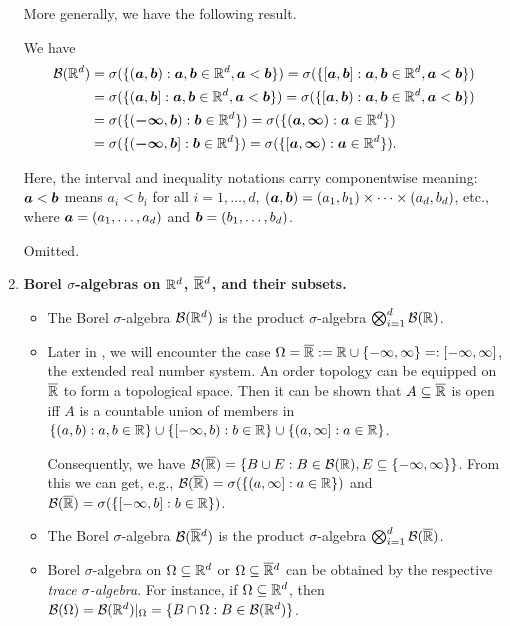 \begin{enumerate}
More generally, we have the following result.
\begin{proposition}
\label{prp:borel-rd-generators}
We have
\begin{align*}
\mathcal{B}(\mathbb{R}^d)
&=\sigma(\{(\bm{a},\bm{b}):\bm{a},\bm{b}\in\mathbb{R}^d, \bm{a}<\bm{b}\})
=\sigma(\{[\bm{a},\bm{b}]:\bm{a},\bm{b}\in\mathbb{R}^d, \bm{a}<\bm{b}\}) \\
&=\sigma(\{(\bm{a},\bm{b}]:\bm{a},\bm{b}\in\mathbb{R}^d, \bm{a}<\bm{b}\})
=\sigma(\{[\bm{a},\bm{b}):\bm{a},\bm{b}\in\mathbb{R}^d, \bm{a}<\bm{b}\}) \\
&=\sigma(\{(\bm{-\infty},\bm{b}):\bm{b}\in\mathbb{R}^d\})
=\sigma(\{(\bm{a},\bm{\infty}):\bm{a}\in\mathbb{R}^d\}) \\
&=\sigma(\{(\bm{-\infty},\bm{b}]:\bm{b}\in\mathbb{R}^d\})
=\sigma(\{[\bm{a},\bm{\infty}):\bm{a}\in\mathbb{R}^d\}).
\end{align*}
\end{proposition}
\begin{note}
Here, the interval and inequality notations carry componentwise meaning:
\(\bm{a}<\bm{b}\) means \(a_i<b_i\) for all \(i=1,\dotsc,d\),
\((\bm{a},\bm{b})=(a_1,b_1)\times\dotsb\times (a_d,b_d)\), etc., where
\(\bm{a}=(a_1,\dotsc,a_d)\) and \(\bm{b}=(b_1,\dotsc,b_d)\).
\end{note}
\begin{pf}
Omitted.
\end{pf}
\item \textbf{Borel \(\sigma\)-algebras on \(\mathbb{R}^d\), \(\overline{\mathbb{R}}{}^d\), and their subsets.}
\begin{itemize}
\item The Borel \(\sigma\)-algebra \(\mathcal{B}(\mathbb{R}^d)\) is the
product \(\sigma\)-algebra \(\bigotimes_{i=1}^{d}\mathcal{B}(\mathbb{R})\).
\item Later in , we will encounter the case
\(\Omega=\overline{\mathbb{R}}:=\mathbb{R}\cup\{-\infty,\infty\}=:[-\infty,\infty]\), the extended real
number system. An order topology can be equipped on \(\overline{\mathbb{R}}\) to form a
topological space. Then it can be shown that \(A\subseteq \overline{\mathbb{R}}\) is open iff
\(A\) is a countable union of members in
\(\{(a,b):a,b\in\mathbb{R}\}\cup\{[-\infty,b):b\in\mathbb{R}\}\cup\{(a,\infty]:a\in\mathbb{R}\}\).

Consequently, we have \(\mathcal{B}(\overline{\mathbb{R}})=\{B\cup E:B\in\mathcal{B}(\mathbb{R}), E\subseteq \{-\infty,\infty\}\}\).
From this we can get, e.g., \(\mathcal{B}(\overline{\mathbb{R}})=\sigma(\{(a,\infty]:a\in\mathbb{R}\})
\) and \(\mathcal{B}(\overline{\mathbb{R}})=\sigma(\{[-\infty,b]:b\in\mathbb{R}\})\).

\item The Borel \(\sigma\)-algebra \(\mathcal{B}(\overline{\mathbb{R}}{}^d)\) is the
product \(\sigma\)-algebra \(\bigotimes_{i=1}^{d}\mathcal{B}(\overline{\mathbb{R}})\).

\item Borel \(\sigma\)-algebra on \(\Omega\subseteq \mathbb{R}^d\) or \(\Omega\subseteq
\overline{\mathbb{R}}{}^d\) can be obtained by the respective \emph{trace \(\sigma\)-algebra}.
For instance, if \(\Omega\subseteq \mathbb{R}^d\), then
\(\mathcal{B}(\Omega)=\mathcal{B}(\mathbb{R}^d)|_{\Omega}
=\{B\cap\Omega:B\in\mathcal{B}(\mathbb{R}^d)\}\).

\end{itemize}
\end{enumerate}
